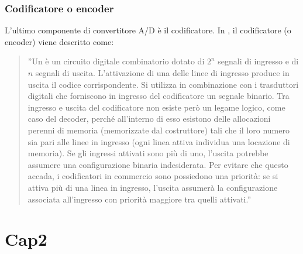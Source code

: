\documentclass[a4paper]{report} %
\begin{document}
\subsection{Codificatore o encoder}
L'ultimo componente di convertitore A/D è il codificatore. In \cite{art:rif.3}, il codificatore (o encoder) viene descritto come:
\begin{quote}
	''Un è un circuito digitale combinatorio dotato di $2^{n}$ segnali di ingresso e di $n$ segnali di uscita. L'attivazione di una delle linee di ingresso produce in uscita il codice corrispondente. Si utilizza in combinazione con i trasduttori digitali che forniscono in ingresso del codificatore un segnale binario. Tra ingresso e uscita del codificatore non esiste però un legame logico, come caso del decoder, perché all'interno di esso esistono delle allocazioni perenni di memoria (memorizzate dal costruttore) tali che il loro numero sia pari alle linee in ingresso (ogni linea attiva individua una locazione di memoria). Se gli ingressi attivati sono più di uno, l'uscita potrebbe assumere una configurazione binaria indesiderata. Per evitare che questo accada, i codificatori in commercio sono possiedono una priorità: se si attiva più di una linea in ingresso, l'uscita assumerà la configurazione associata all'ingresso con priorità maggiore tra quelli attivati.'' 
\end{quote}
 
\chapter{Cap2}
\end{document}
